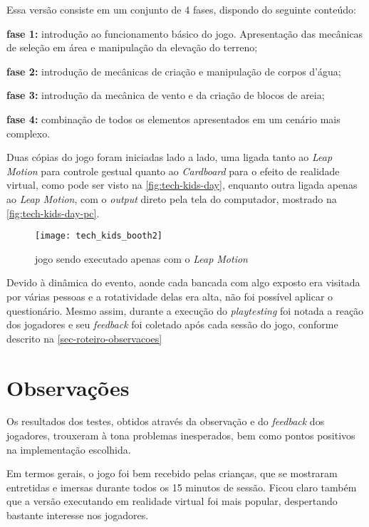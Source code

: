 Essa versão consiste em um conjunto de 4 fases, dispondo do seguinte conteúdo:

\begin{alineas}
	\item \textbf{fase 1:} introdução ao funcionamento básico do jogo. Apresentação das mecânicas de seleção em área e manipulação da elevação do terreno;
	\item \textbf{fase 2:} introdução de mecânicas de criação e manipulação de corpos d'água;
	\item \textbf{fase 3:} introdução da mecânica de vento e da criação de blocos de areia;
	\item \textbf{fase 4:} combinação de todos os elementos apresentados em um cenário mais complexo.
\end{alineas}

Duas cópias do jogo foram iniciadas lado a lado, uma ligada tanto 
ao \textit{Leap Motion} para controle gestual quanto ao \textit{Cardboard} 
para o efeito de realidade virtual, como pode ser visto 
na \autoref{fig:tech-kids-day}, enquanto outra ligada apenas ao 
\textit{Leap Motion}, com o \textit{output} direto pela tela do computador, 
mostrado na \autoref{fig:tech-kids-day-pc}.

\begin{figure}[h]
	\centering
	\caption{jogo sendo executado apenas com o \textit{Leap Motion}}
	\texttt{[image: tech\_kids\_booth2]}
	\legend{\fonteAP}
	\label{fig:tech-kids-day-pc}
\end{figure}

Devido à dinâmica do evento, aonde cada bancada com algo exposto 
era visitada por várias pessoas e a rotatividade delas era alta, 
não foi possível aplicar o questionário. Mesmo assim, durante a 
execução do \textit{playtesting} 
foi notada a reação dos 
jogadores e seu \textit{feedback} foi coletado após cada sessão do jogo, 
conforme descrito na \autoref{sec-roteiro-observacoes}

\section{Observações}\label{sec-roteiro-observacoes}

Os resultados dos testes, obtidos através da observação e do 
\textit{feedback} dos jogadores, trouxeram à tona problemas inesperados, 
bem como pontos positivos na implementação escolhida.

Em termos gerais, o jogo foi bem recebido pelas crianças, que se 
mostraram entretidas e imersas durante todos os 15 minutos de sessão. Ficou claro 
também que a versão executando em realidade virtual foi mais popular, 
despertando bastante interesse nos jogadores.

